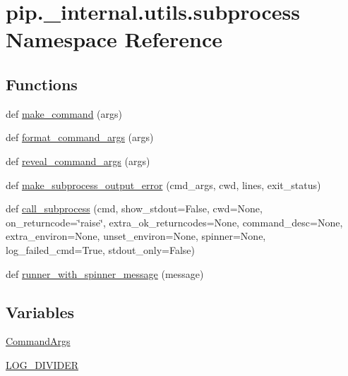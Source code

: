 \hypertarget{namespacepip_1_1__internal_1_1utils_1_1subprocess}{}\section{pip.\+\_\+internal.\+utils.\+subprocess Namespace Reference}
\label{namespacepip_1_1__internal_1_1utils_1_1subprocess}
\subsection*{Functions}
\begin{DoxyCompactItemize}
\item 
def \hyperlink{namespacepip_1_1__internal_1_1utils_1_1subprocess_a315498638ac5b88744748fa91671c17a}{make\+\_\+command} (args)
\item 
def \hyperlink{namespacepip_1_1__internal_1_1utils_1_1subprocess_a555d52c519beee42615b9db004f18d59}{format\+\_\+command\+\_\+args} (args)
\item 
def \hyperlink{namespacepip_1_1__internal_1_1utils_1_1subprocess_a550dccfe24824c5345f989cdd92d8b37}{reveal\+\_\+command\+\_\+args} (args)
\item 
def \hyperlink{namespacepip_1_1__internal_1_1utils_1_1subprocess_a69e159aa9db850860bed4f4a64da8598}{make\+\_\+subprocess\+\_\+output\+\_\+error} (cmd\+\_\+args, cwd, lines, exit\+\_\+status)
\item 
def \hyperlink{namespacepip_1_1__internal_1_1utils_1_1subprocess_abba62bba85561b170942cc705f7a325a}{call\+\_\+subprocess} (cmd, show\+\_\+stdout=False, cwd=None, on\+\_\+returncode=\char`\"{}raise\char`\"{}, extra\+\_\+ok\+\_\+returncodes=None, command\+\_\+desc=None, extra\+\_\+environ=None, unset\+\_\+environ=None, spinner=None, log\+\_\+failed\+\_\+cmd=True, stdout\+\_\+only=False)
\item 
def \hyperlink{namespacepip_1_1__internal_1_1utils_1_1subprocess_a1a8d53bdd89463ba5941dfb10aaf153b}{runner\+\_\+with\+\_\+spinner\+\_\+message} (message)
\end{DoxyCompactItemize}
\subsection*{Variables}
\begin{DoxyCompactItemize}
\item 
\hyperlink{namespacepip_1_1__internal_1_1utils_1_1subprocess_aa5735a299d9c96782540b9e5d56361f2}{Command\+Args}
\item 
\hyperlink{namespacepip_1_1__internal_1_1utils_1_1subprocess_af7549782f1cefcfe4c4a53bfdfa761c7}{L\+O\+G\+\_\+\+D\+I\+V\+I\+D\+ER}
\end{DoxyCompactItemize}


